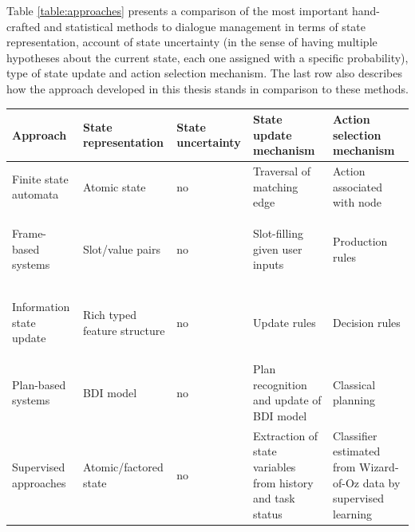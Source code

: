Table \ref{table:approaches} presents a comparison of the most important hand-crafted and statistical methods to dialogue management in terms of state representation, account of state uncertainty (in the sense of having multiple hypotheses about the current state, each one assigned with a specific probability), type of state update and action selection mechanism.  The last row also describes how the approach developed in this thesis stands in comparison to these methods. 
  
\renewcommand{\arraystretch}{2.0}
\setlength{\tabcolsep}{8pt}
\begin{table}
\begin{center}
\begin{tabular}{|p{55mm}||p{31mm}|p{16mm}|p{50mm}|p{66mm}|} \hline
\centering \textbf{Approach} &  \centering \textbf{State representation} &  \centering \textbf{State uncertainty} &  \centering \textbf{State update mechanism} & \textbf{Action selection mechanism} \vspace{5pt} \\  \hline \hline
Finite state automata & Atomic state & no & Traversal of matching edge & Action associated with node \vspace{5pt} \\ \hline
Frame-based systems \; \; \; \; \; \; \; \; \; \; \; \; \begin{footnotesize}\citep[e.g.][]{seneff2000}\end{footnotesize}& Slot/value pairs & no & Slot-filling given user inputs & Production rules \vspace{5pt} \\ \hline
Information state update \; \; \; \; \; \; \begin{footnotesize}\citep[e.g.][]{Larsson:2000}\end{footnotesize} & Rich typed feature structure \vspace{5pt} & no & Update rules & Decision rules \vspace{5pt} \\ \hline
Plan-based systems   \; \;  \; \; \; \; \; \; \; \; \begin{footnotesize}\citep[e.g.][]{Freedman:2000,Allen:2000:AGD:973935.973937}\end{footnotesize} & BDI model \vspace{5pt} & no & Plan recognition and update of BDI model & Classical planning \vspace{5pt} \\ \hline
Supervised approaches \; \; \; \; \; \; \; \; \begin{footnotesize}\citep[e.g.][]{Hurtado:2005}\end{footnotesize} & Atomic/factored state & no & Extraction of state variables from history and task status & Classifier estimated from Wizard-of-Oz data by supervised learning\vspace{5pt} \\ \hline

\end{tabular}
\end{center}
\end{table}
